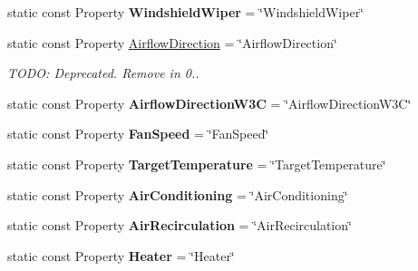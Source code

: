 \begin{DoxyCompactItemize}
\item 
\hypertarget{classVehicleProperty_afe911cbe3c105b89c0f5b9f0163698c8}{static const Property {\bfseries Windshield\-Wiper} = \char`\"{}Windshield\-Wiper\char`\"{}}\label{classVehicleProperty_afe911cbe3c105b89c0f5b9f0163698c8}

\item 
\hypertarget{classVehicleProperty_adeeec47dbbcc60ee78b30c8c1a917836}{static const Property \hyperlink{classVehicleProperty_adeeec47dbbcc60ee78b30c8c1a917836}{Airflow\-Direction} = \char`\"{}Airflow\-Direction\char`\"{}}\label{classVehicleProperty_adeeec47dbbcc60ee78b30c8c1a917836}

\begin{DoxyCompactList}\small\item\em T\-O\-D\-O\-: Deprecated. Remove in 0.. \end{DoxyCompactList}\item 
\hypertarget{classVehicleProperty_ac64308c4604fcdcc341621256923e25f}{static const Property {\bfseries Airflow\-Direction\-W3\-C} = \char`\"{}Airflow\-Direction\-W3\-C\char`\"{}}\label{classVehicleProperty_ac64308c4604fcdcc341621256923e25f}

\item 
\hypertarget{classVehicleProperty_afd2a544499ec8ddc83127ef268f9e5e5}{static const Property {\bfseries Fan\-Speed} = \char`\"{}Fan\-Speed\char`\"{}}\label{classVehicleProperty_afd2a544499ec8ddc83127ef268f9e5e5}

\item 
\hypertarget{classVehicleProperty_a14d5cc6734fa65eb1e352d9ddbe05c17}{static const Property {\bfseries Target\-Temperature} = \char`\"{}Target\-Temperature\char`\"{}}\label{classVehicleProperty_a14d5cc6734fa65eb1e352d9ddbe05c17}

\item 
\hypertarget{classVehicleProperty_a45738d294fe38c6fa5f198c30b17153c}{static const Property {\bfseries Air\-Conditioning} = \char`\"{}Air\-Conditioning\char`\"{}}\label{classVehicleProperty_a45738d294fe38c6fa5f198c30b17153c}

\item 
\hypertarget{classVehicleProperty_aa5c99592d51aa0a05eb277563c2273d7}{static const Property {\bfseries Air\-Recirculation} = \char`\"{}Air\-Recirculation\char`\"{}}\label{classVehicleProperty_aa5c99592d51aa0a05eb277563c2273d7}

\item 
\hypertarget{classVehicleProperty_ad5a3fdf51333943c486fa216e894cb29}{static const Property {\bfseries Heater} = \char`\"{}Heater\char`\"{}}\label{classVehicleProperty_ad5a3fdf51333943c486fa216e894cb29}


\end{DoxyCompactItemize}

